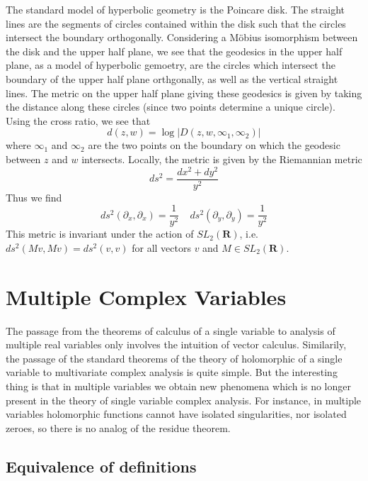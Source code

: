 The standard model of hyperbolic geometry is the Poincare disk. The straight lines are the segments of circles contained within the disk such that the circles intersect the boundary orthogonally. Considering a M\"{o}bius isomorphism between the disk and the upper half plane, we see that the geodesics in the upper half plane, as a model of hyperbolic gemoetry, are the circles which intersect the boundary of the upper half plane orthgonally, as well as the vertical straight lines. The metric on the upper half plane giving these geodesics is given by taking the distance along these circles (since two points determine a unique circle). Using the cross ratio, we see that
%
\[ d(z,w) = \log | D(z,w,\infty_1, \infty_2) | \]
%
where $\infty_1$ and $\infty_2$ are the two points on the boundary on which the geodesic between $z$ and $w$ intersects. Locally, the metric is given by the Riemannian metric
%
\[ ds^2 = \frac{dx^2 + dy^2}{y^2} \]
%
Thus we find
%
\[ ds^2(\partial_x, \partial_x) = \frac{1}{y^2}\ \ \ \ \ ds^2(\partial_y, \partial_y) = \frac{1}{y^2}  \]
%
This metric is invariant under the action of $SL_2(\mathbf{R})$, i.e. $ds^2(Mv,Mv) = ds^2(v,v)$ for all vectors $v$ and $M \in SL_2(\mathbf{R})$.
%




\chapter{Multiple Complex Variables}

The passage from the theorems of calculus of a single variable to analysis of multiple real variables only involves the intuition of vector calculus. Similarily, the passage of the standard theorems of the theory of holomorphic of a single variable to multivariate complex analysis is quite simple. But the interesting thing is that in multiple variables we obtain new phenomena which is no longer present in the theory of single variable complex analysis. For instance, in multiple variables holomorphic functions cannot have isolated singularities, nor isolated zeroes, so there is no analog of the residue theorem.

\section{Equivalence of definitions}

